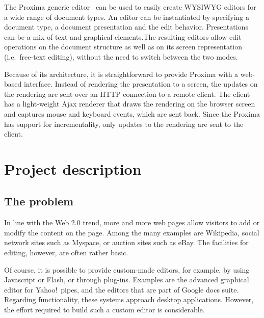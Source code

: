 \documentclass[10pt]{article}
\begin{document}
The Proxima generic editor~\cite{schrage08proximaHome, schrage04proxima} can be used to easily create WYSIWYG editors for a wide range of document types. An editor can be instantiated by specifying a document type, a document presentation and the edit behavior. Presentations can be a mix of text and graphical elements.The resulting editors allow edit operations on the document structure as well as on its screen representation (i.e.\ free-text editing), without the need to switch between the two modes.

Because of its architecture, it is straightforward to provide Proxima with a web-based interface. Instead of rendering the presentation to a screen, the updates on the rendering are sent over an HTTP connection to a remote client. The client has a light-weight Ajax renderer that draws the rendering on the browser screen and captures mouse and keyboard events, which are sent back. Since the Proxima has support for incrementality, only updates to the rendering are sent to the client.

\ec



\section{Project description}

\subsection{The problem} 

In line with the Web 2.0 trend, more and more web pages allow visitors to add or modify the content on the page. Among the many examples are Wikipedia, social network sites such as Myspace, or auction sites such as eBay. The facilities for editing, however, are often rather basic. 

Of course, it is possible to provide custom-made editors, for example, by using Javascript or Flash, or through plug-ins. Examples are the advanced graphical editor for Yahoo!\ pipes, and the editors that are part of Google docs suite. Regarding functionality, these systems approach desktop applications. However, the effort required to build such a custom editor is considerable.
\end{document}
